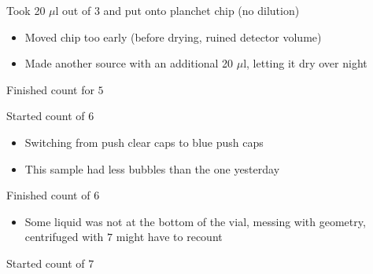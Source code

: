 \documentclass[idxtotoc,hyperref,openany,oneside]{labbook} %
\newcommand{\cmark}{\ding{51}}%
\newcommand{\done}{\rlap{$\square$}{\raisebox{2pt}{\large\hspace{1pt}\cmark}}%
  \hspace{-2.5pt}}
\begin{document}

\begin{todolist}
\item[\done]{Took 20 $\mu$l out of $\boxed{3}$ and put
  onto planchet chip (no dilution)}
  \begin{itemize}
  \item{Moved chip too early (before drying, ruined
    detector volume)}
  \item{Made another source with an additional 20 $\mu$l,
    letting it dry over night}
  \end{itemize}
\end{todolist}






\begin{todolist}
\item[\done]{Finished count for $\boxed{5}$}
\item[\done]{Started count of $\boxed{6}$}
  \begin{itemize}
  \item{Switching from push clear caps to blue push caps}
  \item{This sample had less bubbles than the one yesterday}
  \end{itemize}
\item[\done]{Finished count of $\boxed{6}$}
  \begin{itemize}
  \item{Some liquid was not at the bottom of the vial,
    messing with geometry, centrifuged with $\boxed{7}$
    might have to recount}
  \end{itemize}
\item[\done]{Started count of $\boxed{7}$}
  
\end{todolist}


\end{document}
